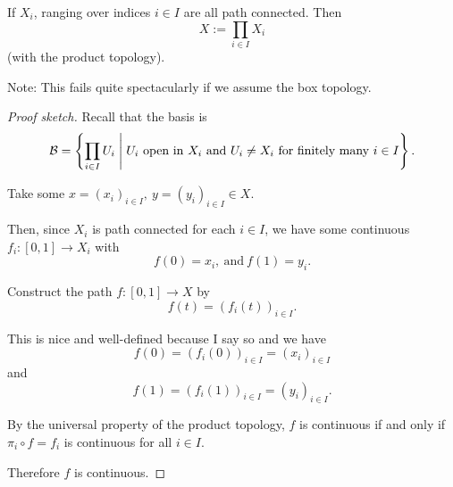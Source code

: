 \documentclass[11pt]{article}
\begin{document}
\begin{prop}\label{prop:product_space_path_connected}
    If $X_i$, ranging 
    over indices $i \in I$ are all path connected. 
    Then 
    \[
        X := \prod_{i\in I} X_i 
    \]
     (with the product topology). 

    Note: This fails quite spectacularly if we 
    assume the box topology. 
\end{prop}
\begin{proof}[Proof sketch]
    Recall that the basis is 
    \[
        \mathcal B = \left\{
            \prod_{i \in I} U_i \Biggm| 
            U_i \ \text{open} \ \text{in} \ X_i \ \text{and} \ 
            U_i \neq X_i \ \text{for finitely many} \ i \in I
        \right\}.
    \]

    Take some $x = (x_i)_{i\in I}, \ y = 
    (y_i)_{i \in I} \in X$. 

    Then, since $X_i$ is path connected 
    for each $i \in I$, we have 
    some continuous 
    $f_{i} : [0,1] \to X_i$ with 
    \[
        f(0) = x_i, \ \text{and} \ f(1) = y_i. 
    \]

    Construct the path $f : [0,1] \to X$ by 
    \[
        f(t) = (f_i(t))_{i \in I}.   
    \]

    This is nice and well-defined because I say so and we have 
    \[
        f(0) = (f_i(0))_{i \in I} 
        = (x_i)_{i\in I}
    \]
    and 
    \[
        f(1) = (f_i(1))_{i \in I} 
        = (y_i)_{i \in I}. 
    \]

    By the universal property of the 
    product topology, $f$ is continuous if and only if 
    $\pi_i \circ f = f_i$ is continuous for all 
    $i \in I$. 
    
    Therefore $f$ is continuous.
\end{proof}
\end{document}
